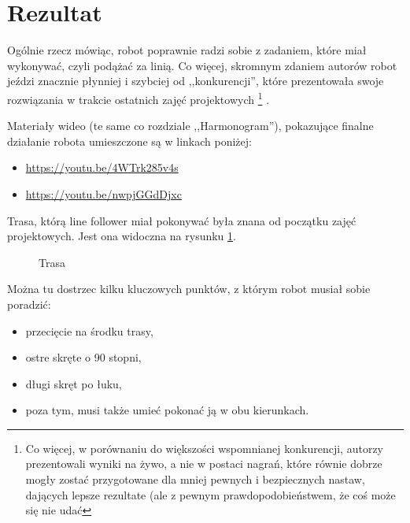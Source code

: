\documentclass[11pt]{article}
\begin{document}
\newpage

\section{Rezultat}

Ogólnie rzecz mówiąc, robot poprawnie radzi sobie z zadaniem, które miał wykonywać, czyli podążać za linią. Co więcej, skromnym zdaniem autorów robot jeździ znacznie płynniej i szybciej od ,,konkurencji'', które prezentowała swoje rozwiązania w trakcie ostatnich zajęć projektowych%
\footnote{Co więcej, w porównaniu do większości wspomnianej konkurencji, autorzy prezentowali wyniki na żywo, a nie w postaci nagrań, które równie dobrze mogły zostać przygotowane dla mniej pewnych i bezpiecznych nastaw, dających lepsze rezultate (ale z pewnym prawdopodobieństwem, że coś może się nie udać}%
.

Materiały wideo (te same co rozdziale ,,Harmonogram''), pokazujące finalne działanie robota umieszczone są w linkach poniżej:
\begin{itemize}
\item \href{https://youtu.be/4WTrk285v4s}{https://youtu.be/4WTrk285v4s}
\item \href{https://youtu.be/nwpjGGdDjxc}{https://youtu.be/nwpjGGdDjxc}
\end{itemize}

Trasa, którą line follower miał pokonywać była znana od początku zajęć projektowych. Jest ona widoczna na rysunku \ref{fig:trasa}.
\begin{figure}[htbp!]
	\centering
	
	\hfill%
	
	\caption{Trasa \label{fig:trasa}}
\end{figure}

Można tu dostrzec kilku kluczowych punktów, z którym robot musiał sobie poradzić:
\begin{itemize}
\item przecięcie na środku trasy,
\item ostre skręte o 90 stopni,
\item długi skręt po łuku,
\item poza tym, musi także umieć pokonać ją w obu kierunkach.
\end{itemize}
\end{document}
